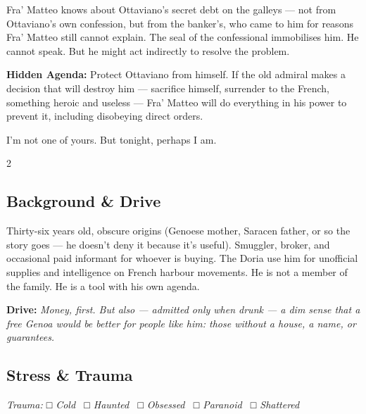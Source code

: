 \begin{secretbox}
Fra' Matteo knows about Ottaviano's secret debt on the galleys --- not from
Ottaviano's own confession, but from the banker's, who came to him for reasons
Fra' Matteo still cannot explain. The seal of the confessional immobilises him.
He cannot speak. But he might act indirectly to resolve the problem.

\medskip
\textbf{\textcolor{SecretRed}{Hidden Agenda:}} Protect Ottaviano from himself.
If the old admiral makes a decision that will destroy him --- sacrifice himself,
surrender to the French, something heroic and useless --- Fra' Matteo will
do everything in his power to prevent it, including disobeying direct orders.
\end{secretbox}

\newpage


%
  {I'm not one of yours. But tonight, perhaps I am.}

\begin{multicols}{2}
\subsection*{Background \& Drive}
Thirty-six years old, obscure origins (Genoese mother, Saracen father,
or so the story goes --- he doesn't deny it because it's useful).
Smuggler, broker, and occasional paid informant for whoever is buying.
The Doria use him for unofficial supplies and intelligence on French
harbour movements. He is not a member of the family. He is a tool with
his own agenda.

\textbf{\textcolor{DoriaBlue}{Drive:}} \textit{Money, first. But also ---
admitted only when drunk --- a dim sense that a free Genoa would be better
for people like him: those without a house, a name, or guarantees.}
\columnbreak
\subsection*{Stress \& Trauma}
\textit{\small Trauma: □ Cold \ □ Haunted \ □ Obsessed \ □ Paranoid \ □ Shattered}
\end{multicols}

